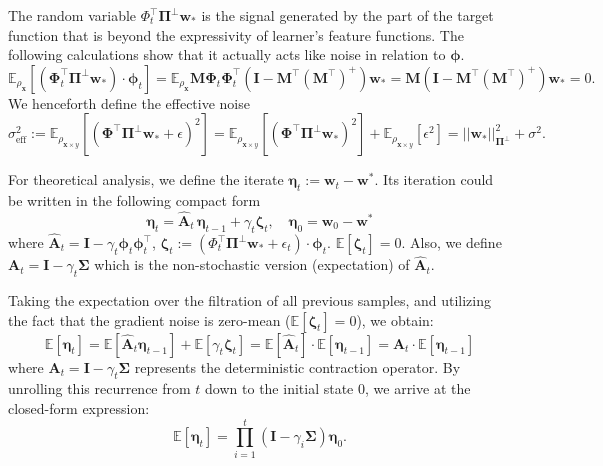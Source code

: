 \documentclass{article}
\theoremstyle{definition}
\theoremstyle{definition}
\theoremstyle{plain}
\theoremstyle{plain}
\theoremstyle{plain}
\theoremstyle{plain}
\theoremstyle{plain}
\newcommand{\bs}[1]{\boldsymbol{\mathbf{#1}}}
\newcommand{\Ex}{\mathbb{E}}
\newcommand{\vecx}{\mathbf{x}}
\newcommand{\eff}{\mathrm{eff}}
\newcommand{\M}{\mathbf{M}}
\newcommand{\w}{\mathbf{w}}
\newcommand{\id}{\mathbf{I}}
\begin{document}
The random variable $\Phi^\top_t\mathbf{\Pi}^\perp\w_*$ is the signal generated by the part of the target function that is beyond the expressivity of learner's feature functions. The following calculations show that it actually acts like noise in relation to $\bs\phi$.
\begin{equation}
\Ex_{\rho_\vecx}\left[\left(\bs\Phi^\top_t\mathbf{\Pi}^\perp\w_*\right)\cdot\bs\phi_{t}\right] = \Ex_{\rho_\vecx}\M\bs\Phi_t\bs\Phi^\top_t\left(\id - \M^\top\left(\M^{\top}\right)^+\right)\w_* = \M\left(\id - \M^\top\left(\M^{\top}\right)^+\right) \w_* = 0.
\end{equation}
We henceforth define the effective noise
\begin{equation}
    \sigma_{\eff}^2:= \Ex_{\rho_{\vecx\times y}}\left[(\bs\Phi^\top\bs \Pi^{\perp} \w_*+\epsilon)^2\right] = \Ex_{\rho_{\vecx\times y}}\left[(\bs\Phi^\top\bs \Pi^{\perp} \w_*)^2\right]+\Ex_{\rho_{\vecx\times y}}\left[\epsilon^2\right]=||\w_*||_{\bs \Pi^{\perp}}^2+\sigma^2.
\end{equation}


For theoretical analysis, we define the iterate $\bs{\eta}_t:= \w_{t}-\w^*$. Its iteration could be written in the following compact form
\begin{equation}
\label{eq:directdynamics}
    \bs\eta_t = \bs{\widehat A}_t\,\bs\eta_{t-1}+\gamma_t\bs\zeta_t,\quad\bs\eta_0 = \w_0-\w^*
\end{equation}
where $\bs{\widehat A}_{t}=\id - \gamma_t\mathbf{\bs\phi}_{t}\mathbf{\bs\phi}_{t}^\top$, $\bs\zeta_t := (\Phi^\top_t\mathbf{\Pi}^\perp\w_*+\epsilon_t)\cdot\bs\phi_{t}$. $\Ex[\bs\zeta_t]=0$. Also, we define $\bs A_t = \id-\gamma_t\bs\Sigma$ which is the non-stochastic version (expectation) of $\widehat{\bs A}_t$.

Taking the expectation over the filtration of all previous samples, and utilizing the fact that the gradient noise is zero-mean ($\Ex[\bs \zeta_t] = 0$), we obtain:
\begin{equation}
    \Ex[\bs \eta_t] = \Ex[\bs{\widehat A}_t \bs \eta_{t-1}] + \Ex[\gamma_t \bs \zeta_t] = \Ex[\bs{\widehat A}_t] \cdot \Ex[\bs \eta_{t-1}] = \bs A_t \cdot \Ex[\bs \eta_{t-1}]
\end{equation}
where $\bs A_t = \bs I - \gamma_t \bs \Sigma$ represents the deterministic contraction operator. By unrolling this recurrence from $t$ down to the initial state $0$, we arrive at the closed-form expression:
\begin{equation}
    \Ex[\bs \eta_t] = \prod_{i=1}^t(\bs I - \gamma_i \bs \Sigma) \bs \eta_0.
\end{equation}
\end{document}
